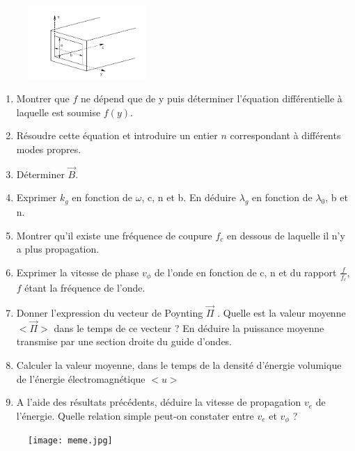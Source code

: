 \documentclass{article}
\begin{document}
\begin{figure}[h]
  \centering
  \includegraphics[width=0.4\textwidth]{schéma_guide_d'ondes.png}
  \label{fig:schéma_guide_'ondes}
\end{figure}
\begin{enumerate}
    \item Montrer que $f$ ne dépend que de y puis déterminer l'équation différentielle à laquelle est soumise $f(y)$.
    \item Résoudre cette équation et introduire un entier $n$ correspondant à différents modes propres. 
    \item Déterminer $\vec{B}$.
    \item Exprimer $k_g$ en fonction de $\omega$, c, n et b. En déduire $\lambda_g$ en fonction de $\lambda_0$, b et n.
    \item Montrer qu’il existe une fréquence de coupure $f_c$ en dessous de laquelle il n’y a plus propagation.
    \item Exprimer la vitesse de phase $v_\phi$ de l’onde en fonction de c, n et du rapport $\frac{f}{f_c}$, $f$ étant la fréquence de l'onde.
    \item  Donner l’expression du vecteur de Poynting $\vec{\Pi}$ . Quelle est
    la valeur moyenne  $<\vec{\Pi}>$ dans le temps de ce vecteur ?
    En déduire la puissance moyenne transmise par une section droite du guide d’ondes.
    \item Calculer la valeur moyenne, dans le temps de la densité d’énergie volumique de l’énergie
    électromagnétique $<u>$
    \item A l’aide des résultats précédents, déduire la vitesse de propagation $v_e$ de l’énergie.
    Quelle relation simple peut-on constater entre $v_e $ et $v_\phi$ ? \\[2cm]
\end{enumerate}

\begin{figure}[h]
  \centering
  \texttt{[image: meme.jpg]}
\end{figure}
\end{document}
